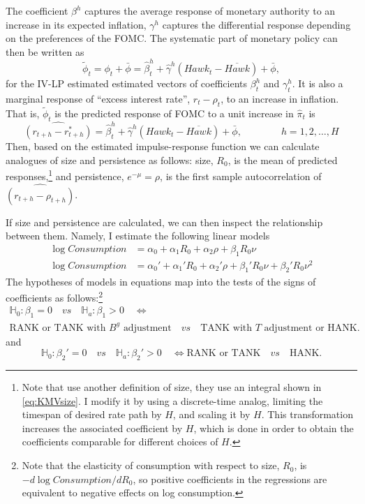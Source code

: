 \documentclass[12pt]{article}
\numberwithin{equation}{section}
\begin{document}
The coefficient $\beta^h$ captures the average response of monetary authority to an increase in its expected inflation, $\gamma^h$ captures the differential response depending on the preferences of the FOMC. The systematic part of monetary policy can then be written as 
\[\tilde \phi_t=\phi_t+\bar\phi=\hat \beta_t^h+\hat\gamma^h \left(\mathit{Hawk}_{t}-\overline{\mathit{Hawk}}\right)+\bar\phi,\]
for the IV-LP estimated estimated vectors of coefficients $\beta_t^h$ and $\gamma_t^h$. It is also a marginal response of ``excess interest rate'', $r_t-\rho_t$, to an increase in inflation. 
That is, $\tilde \phi_t$ is the predicted response of FOMC to a unit increase in $\hat\pi_t$ is 
\begin{equation}
   \widehat{\left(r_{t+h}-r^*_{t+h}\right)}=\hat \beta_t^h+\hat\gamma^h \left(\mathit{Hawk}_{t}-\overline{\mathit{Hawk}}\right)+\bar\phi,\qquad\qquad h=1,2,\dots, H\label{eq:pred_policy}
\end{equation}
Then, based on the estimated impulse-response function we can calculate analogues of size and persistence as follows: size, $R_0$, is the mean of predicted responses,\footnote{Note that \cite{KMV2018} use another definition of size, they use an integral shown in \vref{eq:KMVsize}. I modify it by using a discrete-time analog, limiting the timespan of desired rate path by $H$, and scaling it by $H$. This transformation increases the associated coefficient by $H$, which is done in order to obtain the coefficients comparable for different choices of $H$.} and persistence, $e^{-\mu}=\rho$, is the first sample autocorrelation of $\widehat{\left(r_{t+h}-\rho_{t+h}\right)}$.

If size and persistence are calculated, we can then inspect the relationship between them. Namely, I estimate the following linear models 
\begin{align}
    \log \mathit{Consumption}&=\alpha_0+\alpha_1 R_0+\alpha_2\rho+\beta_1 R_0\nu \label{eq:linear}\\
    \log \mathit{Consumption}&=\alpha_0'+\alpha_1' R_0+\alpha_2'\rho+\beta_1' R_0\nu + \beta_2' R_0\nu^2\label{eq:quadratic}
\end{align} 
The hypotheses of models in equations  map into the tests of the signs of coefficients as follows:\footnote{Note that the elasticity of consumption with respect to size, $R_0$, is $-d\log \mathit{Consumption}/d R_0$, so positive coefficients in the regressions are equivalent to negative effects on log consumption.} 
\begin{multline*}\mathbb{H}_0:\beta_1=0\quad\mathit{vs}\quad \mathbb{H}_a:\beta_1>0\quad\iff\\  \text{RANK or TANK with $B^g$ adjustment}\quad\mathit{vs}\quad \text{TANK with $T$ adjustment or HANK}.\end{multline*}
and
\[\mathbb{H}_0:\beta_2'=0\quad\mathit{vs}\quad \mathbb{H}_a:\beta_2'>0\quad\iff \text{RANK or TANK}\quad\mathit{vs}\quad \text{HANK}.\]
\end{document}
